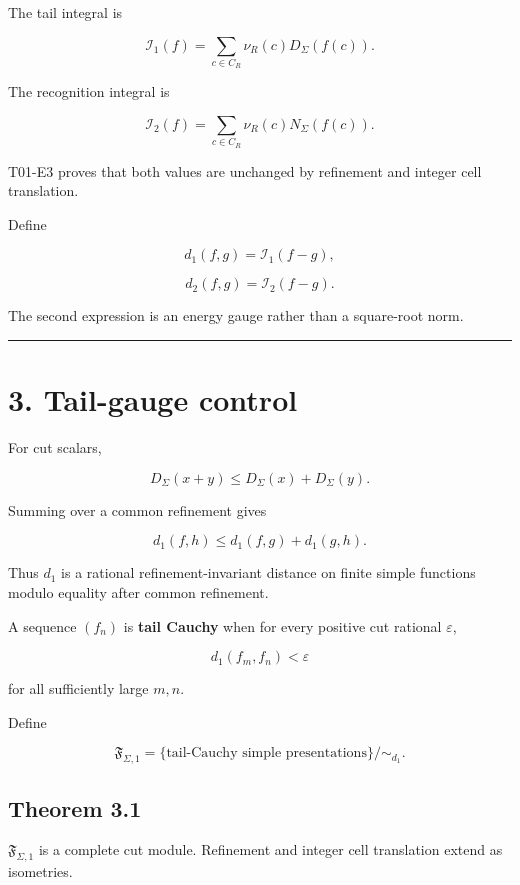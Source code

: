 The tail integral is

\[
\boxed{
\mathcal I_1(f)
=
\sum_{c\in C_R}\nu_R(c)D_\Sigma(f(c)).
}
\tag{2.1}
\]

The recognition integral is

\[
\boxed{
\mathcal I_2(f)
=
\sum_{c\in C_R}\nu_R(c)N_\Sigma(f(c)).
}
\tag{2.2}
\]

T01-E3 proves that both values are unchanged by refinement and integer cell
translation.

Define

\[
d_1(f,g)=\mathcal I_1(f-g),
\tag{2.3}
\]

\[
d_2(f,g)=\mathcal I_2(f-g).
\tag{2.4}
\]

The second expression is an energy gauge rather than a square-root norm.

\begin{center}\rule{0.5\linewidth}{0.5pt}\end{center}

\hypertarget{tail-gauge-control}{%
\section{3. Tail-gauge control}\label{tail-gauge-control}}

For cut scalars,

\[
D_\Sigma(x+y)
\le D_\Sigma(x)+D_\Sigma(y).
\]

Summing over a common refinement gives

\[
\boxed{
d_1(f,h)\le d_1(f,g)+d_1(g,h).}
\tag{3.1}
\]

Thus \(d_1\) is a rational refinement-invariant distance on finite simple
functions modulo equality after common refinement.

A sequence \((f_n)\) is \textbf{tail Cauchy} when for every positive cut rational
\(\varepsilon\),

\[
d_1(f_m,f_n)<\varepsilon
\]

for all sufficiently large \(m,n\).

Define

\[
\boxed{
\mathfrak F_{\Sigma,1}
=
\{\text{tail-Cauchy simple presentations}\}/\sim_{d_1}.
}
\tag{3.2}
\]

\hypertarget{theorem-3.1}{%
\subsection{Theorem 3.1}\label{theorem-3.1}}

\(\mathfrak F_{\Sigma,1}\) is a complete cut module. Refinement and integer cell
translation extend as isometries.


